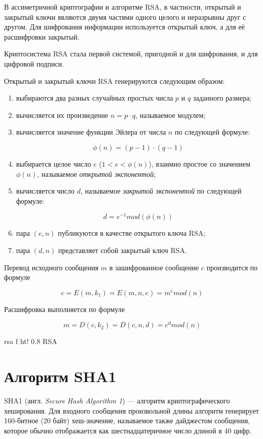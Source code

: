 В ассиметричной криптографии и алгоритме RSA, в частности, открытый и закрытый ключи являются двумя частями одного целого и неразрывны друг с другом. Для шифрования информации используется открытый ключ, а для её расшифровки закрытый.

Криптосистема RSA стала первой системой, пригодной и для шифрования, и для цифровой подписи.

Открытый и закрытый ключи RSA генерируются следующим образом:

\begin{enumerate}[label=\arabic*)]
	\item выбираются два разных случайных простых числа $p$ и $q$ заданного размера;
	\item вычисляется их произведение $n = p \cdot q$, называемое модулем;
	\item вычисляется значение функции Эйлера от числа $n$ по следующей формуле:
	
	$$\phi(n) = (p - 1)\cdot (q - 1)$$
	
	\item выбирается целое число $e$ ($1 < e < \phi(n)$), взаимно простое со значением $\phi(n)$, называемое \textit{открытой экспонентой};
	
	\item вычисляется число $d$, называемое \textit{закрытой экспонентой} по следующей формуле:
	
	$$d  = e^{-1} mod (\phi(n))$$
	
	\item пара $(e, n)$ публикуются в качестве открытого ключа RSA;
	\item пара $(d, n)$  представляет собой закрытый ключ RSA.
\end{enumerate}

Перевод исходного сообщения $m$ в зашифрованное сообщение $c$ производится по формуле

 $$c = E(m, k_1) = E(m, n, e) = m^{e} mod (n)$$

Расшифровка выполняется по формуле

$$m = D(c, k_2) = D(c, n, d) = c^{d} mod (n)$$

{rsa}
{f}
{ht!} 
{0.8\textwidth}
{RSA}

\section{Алгоритм SHA1}

SHA1 (англ. \textit{Secure Hash Algorithm 1}) --- алгоритм криптографического хеширования. 
Для входного сообщения произвольной длины алгоритм генерирует 160-битное (20 байт) хеш-значение, называемое также дайджестом сообщения, которое обычно отображается как шестнадцатеричное число длиной в 40 цифр.


